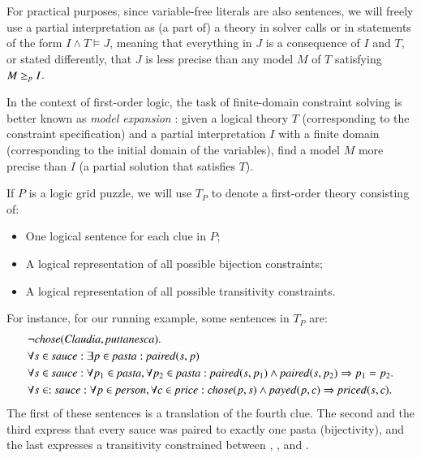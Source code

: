 For practical purposes, since variable-free literals are also sentences, we will freely use a partial interpretation as (a part of) a theory in solver calls or in statements of the form $I\land T \models J$, meaning that everything in $J$ is a consequence of $I$ and $T$, or stated differently, that $J$ is less precise than any model $M$ of $T$ satisfying $M\geq_p I$. 

In the context of first-order logic, the task of finite-domain constraint solving is better known as \emph{model expansion} \cite{MitchellTHM06}: given a logical theory $T$ (corresponding to the constraint specification) and a partial interpretation $I$ with a finite domain (corresponding to the initial domain of the variables), find a model $M$ more precise than $I$ (a partial solution that satisfies $T$).

If $P$ is a logic grid puzzle, we will use $T_P$ to denote a first-order theory consisting of:
\begin{itemize}
 \item One logical sentence for each clue in $P$;
 \item A logical representation of all possible bijection constraints;
 \item A logical representation of all possible transitivity constraints.
\end{itemize}
% 
For instance, for our running example, some sentences in $T_P$ are: 
\begin{align*}
 &\lnot \chose(\claudia, \puttanesca).\\
 & \forall s\in  \sauce : \exists p\in \pasta : \paired(s,p)\\
 & \forall s\in \sauce: \forall p_1\in  \pasta, \forall p_2\in  \pasta:  \paired(s,p_1)\land  \paired(s,p_2)\limplies p_1=p_2. \\
 & \forall s\in :\sauce: \forall p\in \person, \forall c\in \price: \chose(p,s)\land \payed(p,c)\limplies \priced(s,c).  %
\end{align*}
The first of these sentences is a translation of the fourth clue. The second and the third express that every sauce was paired to exactly one pasta (bijectivity), and the last expresses a transitivity constrained between \chose, \payed, and  \priced. 


